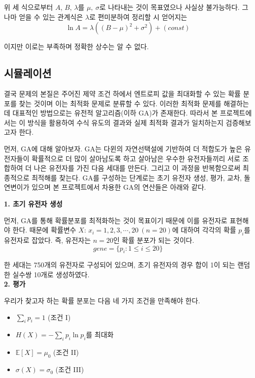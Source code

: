 위 세 식으로부터 $A$, $B$, $\lambda$를 $\mu, ~\sigma$로 나타내는 것이 목표였으나 사실상 불가능하다. 그나마 얻을 수 있는 관계식은 $\lambda$로 편미분하여 정리할 시 얻어지는
\begin{equation}
    \ln{A} = \lambda((B-\mu)^{2}+\sigma^{2}) + (const)
\end{equation}

이지만 이로는 부족하며 정확한 상수는 알 수 없다.

\subsection{시뮬레이션}

결국 문제의 본질은 주어진 제약 조건 하에서 엔트로피 값을 최대화할 수 있는 확률 분포를 찾는 것이며 이는 최적화 문제로 분류할 수 있다. 이러한 최적화 문제를 해결하는데 대표적인 방법으로는 유전적 알고리즘(이하 GA)가 존재한다. 따라서 본 프로젝트에서는 이 방식을 활용하여 수식 유도의 결과와 실제 최적화 결과가 일치하는지 검증해보고자 한다.

먼저, GA에 대해 알아보자. GA는 다윈의 자연선택설에 기반하여 더 적합도가 높은 유전자들이 확률적으로 더 많이 살아남도록 하고 살아남은 우수한 유전자들끼리 서로 조합하여 더 나은 유전자를 가진 다음 세대를 만든다. 그리고 이 과정을 반복함으로써 최종적으로 최적해를 찾는다. GA를 구성하는 단계로는 초기 유전자 생성, 평가, 교차, 돌연변이가 있으며 본 프로젝트에서 차용한 GA의 연산들은 아래와 같다.

\newpage
\textbf{1. 초기 유전자 생성}

먼저, GA를 통해 확률분포를 최적화하는 것이 목표이기 때문에 이를 유전자로 표현해야 한다. 때문에 확률변수 $X$: $x_i = 1, 2, 3, \cdots, 20 ~(n=20)$에 대하여 각각의 확률 $p_i$를 유전자로 잡았다. 즉, 유전자는 $n=20$인 확률 분포가 되는 것이다.
\begin{equation}
    gene = \{ p_i : 1 \leq i \leq 20\}
    \label{gene}
\end{equation}

한 세대는 750개의 유전자로 구성되어 있으며, 초기 유전자의 경우 합이 1이 되는 랜덤한 실수쌍 10개로 생성하였다.\\

\textbf{2. 평가}

우리가 찾고자 하는 확률 분포는 다음 네 가지 조건을 만족해야 한다.
\begin{itemize}
    \item $\sum_i{p_i} = 1$ (조건 I)
    \item $H(X) = -\sum_i{p_i \ln{p_i}}$를 최대화
    \item $\mathbb{E}[X] = \mu_0$ (조건 II)
    \item $\sigma(X) = \sigma_0$ (조건 III)
\end{itemize}

